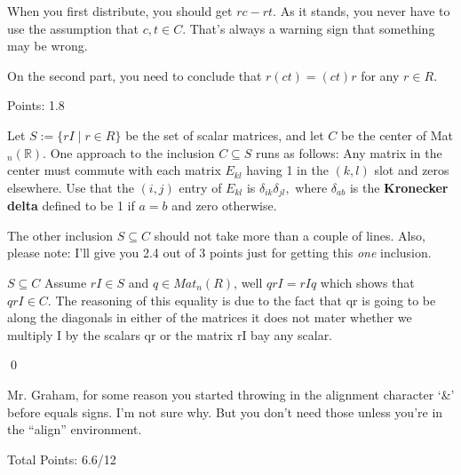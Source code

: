 \documentclass[11pt]{article}
\begin{document}
\begin{solution}
When you first distribute, you should get \(rc-rt\).  As it stands, you never have to use the assumption that \(c,t\in C.\)  That's always a warning sign that something may be wrong.

On the second part, you need to conclude that \(r(ct)=(ct)r\) for any \(r\in R.\)

Points:  1.8
\end{solution}





\hint Let \(S:=\{rI \; | \; r\in R\}\) be the set of scalar matrices, and let \(C\) be the center of Mat\(_n(\mathbb{R})\).  One approach to the inclusion \(C\subseteq S\) runs as follows:  Any matrix in the center must commute with each matrix \(E_{kl}\) having 1 in the \((k,l)\) slot and zeros elsewhere.  Use that the \((i,j)\) entry of \(E_{kl}\) is \(\delta_{ik}\delta_{jl},\) where \(\delta_{ab}\) is the \textbf{Kronecker delta} defined to be 1 if \(a=b\) and zero otherwise.

The other inclusion \(S\subseteq C\) should not take more than a couple of lines.  Also, please note:  I'll give you 2.4 out of 3 points just for getting this \emph{one} inclusion.

\proof
{
\(S\subseteq C\)
    Assume \(rI \in S\) and \(q \in Mat_n(R) \), well \(qrI = rIq\) which shows that \(qrI \in C\). The reasoning of this equality is due to the fact that qr is going to be along the diagonals in either of the matrices it does not mater whether we multiply I by the scalars qr or the matrix rI bay any scalar.
}

\qed

\begin{solution}
Mr. Graham, for some reason you started throwing in the alignment character `\&' before equals signs.  I'm not sure why.  But you don't need those unless you're in the ``align'' environment.

Total Points:  6.6/12
\end{solution}
\end{document}
